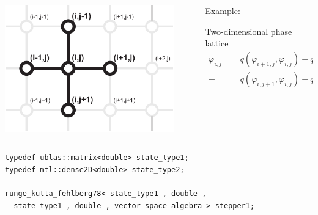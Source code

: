 \begin{frame}[fragile]

 \vspace{1ex}
 \begin{columns}[T]
  \begin{column}{0.35\textwidth}
   \centerline{\includegraphics[draft=false,width=0.9\textwidth]{2dlattice.pdf}}
  \end{column}
  \begin{column}{0.58\textwidth}
Example: 

\vspace{1ex}
Two-dimensional phase lattice
\begin{align*}
\dot{\varphi}_{i,j} = &
  q(\varphi_{i+1,j},\varphi_{i,j}) 
 + q(\varphi_{i-1,j},\varphi_{i,j}) \\
 + & q(\varphi_{i,j+1},\varphi_{i,j}) 
 + q(\varphi_{i,j-1},\varphi_{i,j})
 \end{align*}
  \end{column}
 \end{columns}

\vspace{1ex}

\begin{lstlisting}[basicstyle=\scriptsize\ttfamily]
typedef ublas::matrix<double> state_type1;
typedef mtl::dense2D<double> state_type2;

runge_kutta_fehlberg78< state_type1 , double ,
  state_type1 , double , vector_space_algebra > stepper1;
\end{lstlisting}

\vspace{1ex}



\end{frame}
